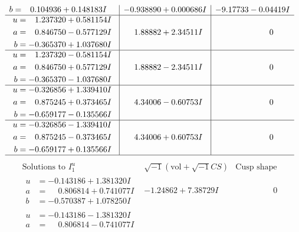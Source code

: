 \documentclass[1p]{elsarticle_modified}
\theoremstyle{definition}
\newcommand{\I}{\sqrt{-1}}
\begin{document}
$$\begin{array}{c|c|c}
\begin{aligned}
b &= \phantom{-}0.104936 + 0.148183 I\end{aligned}
 & -0.938890 + 0.000686 I & -9.17733 - 0.04419 I \\ \hline\begin{aligned}
u &= \phantom{-}1.237320 + 0.581154 I \\
a &= \phantom{-}0.846750 - 0.577129 I \\
b &= -0.365370 + 1.037680 I\end{aligned}
 & \phantom{-}1.88882 + 2.34511 I & \phantom{-0.000000 } 0 \\ \hline\begin{aligned}
u &= \phantom{-}1.237320 - 0.581154 I \\
a &= \phantom{-}0.846750 + 0.577129 I \\
b &= -0.365370 - 1.037680 I\end{aligned}
 & \phantom{-}1.88882 - 2.34511 I & \phantom{-0.000000 } 0 \\ \hline\begin{aligned}
u &= -0.326856 + 1.339410 I \\
a &= \phantom{-}0.875245 + 0.373465 I \\
b &= -0.659177 - 0.135566 I\end{aligned}
 & \phantom{-}4.34006 - 0.60753 I & \phantom{-0.000000 } 0 \\ \hline\begin{aligned}
u &= -0.326856 - 1.339410 I \\
a &= \phantom{-}0.875245 - 0.373465 I \\
b &= -0.659177 + 0.135566 I\end{aligned}
 & \phantom{-}4.34006 + 0.60753 I & \phantom{-0.000000 } 0\\
 \hline 
 \end{array}$$\newpage$$\begin{array}{c|c|c}  
\text{Solutions to }I^u_{1}& \I (\text{vol} + \sqrt{-1}CS) & \text{Cusp shape}\\
 \hline 
\begin{aligned}
u &= -0.143186 + 1.381320 I \\
a &= \phantom{-}0.806814 + 0.741077 I \\
b &= -0.570387 + 1.078250 I\end{aligned}
 & -1.24862 + 7.38729 I & \phantom{-0.000000 } 0 \\ \hline\begin{aligned}
u &= -0.143186 - 1.381320 I \\
a &= \phantom{-}0.806814 - 0.741077 I \\

\end{aligned}
\end{array}$$
\end{document}
